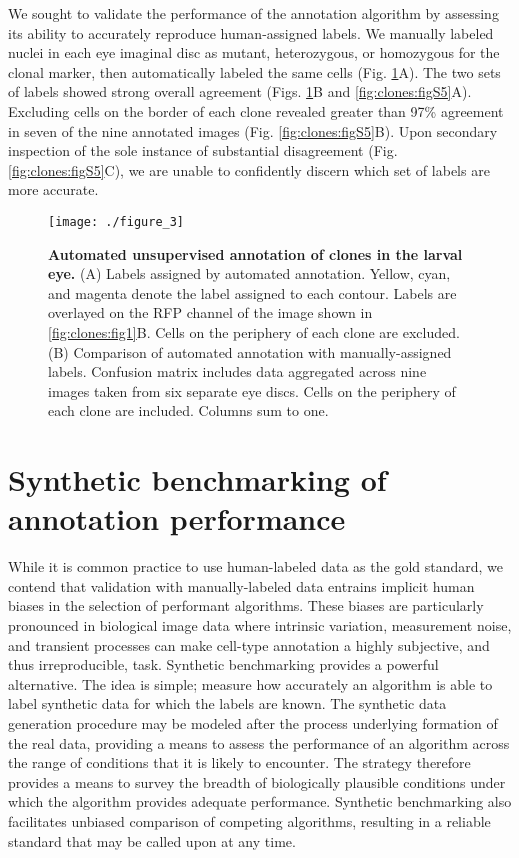 We sought to validate the performance of the annotation algorithm by assessing its ability to accurately reproduce human-assigned labels. We manually labeled nuclei in each eye imaginal disc as mutant, heterozygous, or homozygous for the clonal marker, then automatically labeled the same cells (Fig. \ref{fig:clones:fig3}A). The two sets of labels showed strong overall agreement (Figs. \ref{fig:clones:fig3}B and \ref{fig:clones:figS5}A). Excluding cells on the border of each clone revealed greater than 97\% agreement in seven of the nine annotated images (Fig. \ref{fig:clones:figS5}B). Upon secondary inspection of the sole instance of substantial disagreement (Fig. \ref{fig:clones:figS5}C), we are unable to confidently discern which set of labels are more accurate.

\begin{figure}[t]
\centering
\texttt{[image: ./figure\_3]}
\caption[Automated unsupervised annotation of clones in the larval eye.]{\textbf{Automated unsupervised annotation of clones in the larval eye.} (A) Labels assigned by automated annotation. Yellow, cyan, and magenta denote the label assigned to each contour. Labels are overlayed on the RFP channel of the image shown in \ref{fig:clones:fig1}B. Cells on the periphery of each clone are excluded. (B) Comparison of automated annotation with manually-assigned labels. Confusion matrix includes data aggregated across nine images taken from six separate eye discs. Cells on the periphery of each clone are included. Columns sum to one.}
\label{fig:clones:fig3}
\end{figure}

\section{Synthetic benchmarking of annotation performance}
\label{ch:clones:benchmarking}

While it is common practice to use human-labeled data as the gold standard, we contend that validation with manually-labeled data entrains implicit human biases in the selection of performant algorithms. These biases are particularly pronounced in biological image data where intrinsic variation, measurement noise, and transient processes can make cell-type annotation a highly subjective, and thus irreproducible, task. Synthetic benchmarking provides a powerful alternative. The idea is simple; measure how accurately an algorithm is able to label synthetic data for which the labels are known. The synthetic data generation procedure may be modeled after the process underlying formation of the real data, providing a means to assess the performance of an algorithm across the range of conditions that it is likely to encounter. The strategy therefore provides a means to survey the breadth of biologically plausible conditions under which the algorithm provides adequate performance. Synthetic benchmarking also facilitates unbiased comparison of competing algorithms, resulting in a reliable standard that may be called upon at any time.

